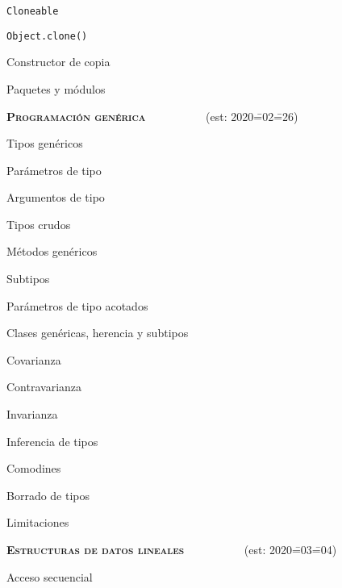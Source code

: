 \begin{longenum}
\begin{longenum}
\begin{longenum}
\begin{longenum}
                \item \texttt{Cloneable}
                \item \texttt{Object.clone()}
                \item Constructor de copia
            \end{longenum}
        \end{longenum}
        \item Paquetes y módulos
    \end{longenum}
    \item \textbf{\textsc{Programación genérica}} \ \ \ \ \ \ \ \ \ \ (est: 2020\==02\==26)
    \begin{longenum}
        \item Tipos genéricos
        \begin{longenum}
            \item Parámetros de tipo
            \item Argumentos de tipo
            \item Tipos crudos
        \end{longenum}
        \item Métodos genéricos
        \item Subtipos
        \begin{longenum}
            \item Parámetros de tipo acotados
            \item Clases genéricas, herencia y subtipos
            \begin{longenum}
                \item Covarianza
                \item Contravarianza
                \item Invarianza
            \end{longenum}
        \end{longenum}
        \item Inferencia de tipos
        \item Comodines
        \item Borrado de tipos
        \item Limitaciones
    \end{longenum}
    \item \textbf{\textsc{Estructuras de datos lineales}} \ \ \ \ \ \ \ \ \ \ (est: 2020\==03\==04)
    \begin{longenum}
        \item Acceso secuencial

\end{longenum}
\end{longenum}
